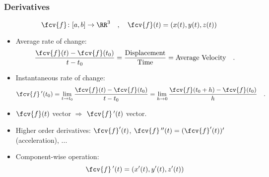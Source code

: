 \begin{frame}
\frametitle{Derivatives}
$$\fcv{f}\colon [a,b]\to \RR^3\quad , \quad \fcv{f}(t) = ( x(t), y(t), z(t))$$
\begin{itemize}
\item  Average rate of change: $$\frac{\fcv{f}(t)-\fcv{f}(t_0)}{t-t_0} = \frac{\text{Displacement}}{\text{Time}} = \text{Average Velocity}\quad .$$
\item<2-> Instantaneous rate of change:
\[
\fcv{f}\,'(t_0) = \lim_{t\to t_0} \frac{\fcv{f}(t)-\fcv{f}(t_0)}{t-t_0} = \lim_{h\to 0}\frac{\fcv{f}(t_0+h)-\fcv{f}(t_0)}{h}\quad .
\]
\item<3-> $\fcv{f}(t)$ vector $\Longrightarrow$ $\fcv{f}\,'(t)$ vector.
\item<4-> Higher order derivatives: $\fcv{f}'(t)$, $\fcv{f}\,''(t) = (\fcv{f}'(t))'$ (acceleration), ...
\item<5-> Component-wise operation: $$\fcv{f}\,'(t) = ( x'(t), y'(t), z'(t))$$
\end{itemize}

\end{frame}
